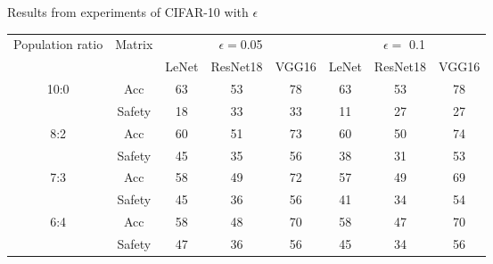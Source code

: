 \documentclass[symmetry,article,submit,moreauthors,pdftex]{Definitions/mdpi}
\begin{document}
\begin{specialtable}[H]
    \centering
    \caption{Results from experiments of CIFAR-10 with \begin{math}\epsilon\end{math}}
    \label{cifar10-result}
    {\small
    \begin{tabular}{|c|c|c|c|c|c|c|c|}
    \hline
    \multirow{2}{*}{Population ratio} & \multirow{2}{*}{Matrix} & \multicolumn{3}{c|}{\begin{math}\epsilon=\end{math}0.05}            & \multicolumn{3}{c|}{\begin{math}\epsilon=\end{math} 0.1}         \\ \cline{3-8} 
                                 &                           & LeNet               & ResNet18              & VGG16              & LeNet              & ResNet18              & VGG16              \\ \hline
    \multirow{2}{*}{10:0}        & Acc                       & 63                  & 53                    & 78                 & 63                 & 53                    & 78                 \\ \cline{2-8} 
                                 & Safety                    & 18                  & 33                    & 33                 & 11                 & 27                    & 27                 \\ \hline
    \multirow{2}{*}{8:2}         & Acc                       & 60                  & 51                    & 73                 & 60                 & 50                    & 74                 \\ \cline{2-8} 
                                 & Safety                    & 45                  & 35                    & 56                 & 38                 & 31                    & 53                 \\ \hline
    \multirow{2}{*}{7:3}         & Acc                       & 58                  & 49                    & 72                 & 57                 & 49                    & 69                 \\ \cline{2-8} 
                                 & Safety                    & 45                  & 36                    & 56                 & 41                 & 34                    & 54                 \\ \hline
    \multirow{2}{*}{6:4}         & Acc                       & 58                  & 48                    & 70                 & 58                 & 47                    & 70                 \\ \cline{2-8} 
                                 & Safety                    & 47                  & 36                    & 56                 & 45                 & 34                    & 56                 \\ \hline
    \end{tabular}
    }
\end{specialtable}
\end{document}
